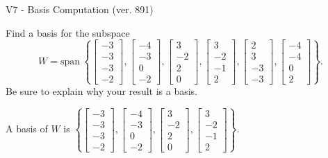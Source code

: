 \begin{exercise}
  \begin{exerciseTitle}V7 - Basis Computation (ver. 891)\end{exerciseTitle}
  \begin{exerciseStatement}
    Find a basis for the subspace 
\[W=\mathrm{span}\ \left\{\left[\begin{array}{r}
-3 \\
-3 \\
-3 \\
-2
\end{array}\right] , \left[\begin{array}{r}
-4 \\
-3 \\
0 \\
-2
\end{array}\right] , \left[\begin{array}{r}
3 \\
-2 \\
2 \\
0
\end{array}\right] , \left[\begin{array}{r}
3 \\
-2 \\
-1 \\
2
\end{array}\right] , \left[\begin{array}{r}
2 \\
3 \\
-3 \\
-3
\end{array}\right] , \left[\begin{array}{r}
-4 \\
-4 \\
0 \\
2
\end{array}\right]\right\}.\]
 Be sure to explain why your result is a basis.


  \end{exerciseStatement}
  \begin{exerciseAnswer}
   A basis of \(W\) is  \(\left\{\left[\begin{array}{r}
-3 \\
-3 \\
-3 \\
-2
\end{array}\right] , \left[\begin{array}{r}
-4 \\
-3 \\
0 \\
-2
\end{array}\right] , \left[\begin{array}{r}
3 \\
-2 \\
2 \\
0
\end{array}\right] , \left[\begin{array}{r}
3 \\
-2 \\
-1 \\
2
\end{array}\right]\right\}\).
  


  \end{exerciseAnswer}
\end{exercise}